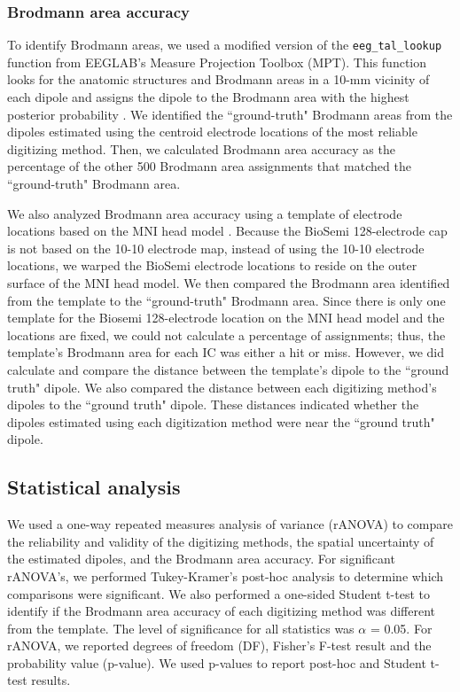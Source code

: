 \documentclass{UCF_ETD}
\renewcommand{\ul}{}
\begin{document}
\subsubsection{Brodmann area accuracy}    
To identify Brodmann areas, we used a modified version of the {\tt \texttt{eeg\_tal\_lookup}} function from EEGLAB's Measure Projection Toolbox (MPT). This function looks for the anatomic structures and Brodmann areas in a 10-mm vicinity of each dipole and assigns the dipole to the Brodmann area with the highest posterior probability \citep{Bigdely-Shamlo2013-jv,Lancaster2000-aj}. \ul{We identified the ``ground-truth" Brodmann areas from the dipoles estimated using the centroid electrode locations of the most reliable digitizing method.} Then, we calculated Brodmann area accuracy as the percentage of the other 500 Brodmann area assignments that matched the ``ground-truth" Brodmann area. 

We also analyzed Brodmann area accuracy using a template of electrode locations based on the MNI head model \citep{Oostenveld2001-vg}. Because the BioSemi 128-electrode cap is not based on the 10-10 electrode map, \ul{instead of using the 10-10 electrode locations, we warped the BioSemi electrode locations to reside on the outer surface of the MNI head model.} We then compared the Brodmann area identified from the template to the ``ground-truth" Brodmann area. \ul{Since there is only one template for the Biosemi 128-electrode location on the MNI head model and the locations are fixed}, we could not calculate a percentage of assignments; thus, the template's Brodmann area for each IC was either a hit or miss. However, we did calculate and compare the distance between the template's dipole to the ``ground truth" dipole. \ul{We also compared} the distance between each digitizing method's dipoles to the ``ground truth" dipole. These distances indicated whether the dipoles \ul{estimated using each digitization method} were near the ``ground truth" dipole. 

\subsection{Statistical analysis}
We used a one-way repeated measures analysis of variance (rANOVA) to compare the reliability and validity of the digitizing methods, the spatial uncertainty of the estimated dipoles, and the Brodmann area accuracy. For significant rANOVA's, we performed Tukey-Kramer's post-hoc analysis to determine which comparisons were significant. We also performed a one-sided Student t-test to identify if the Brodmann area accuracy of each digitizing method was different from the template. The level of significance for all statistics was $\alpha$ = 0.05. \ul{For rANOVA, we reported degrees of freedom (DF), Fisher's F-test result and the probability value (p-value). We used p-values to report post-hoc and Student t-test results.} 
\end{document}
